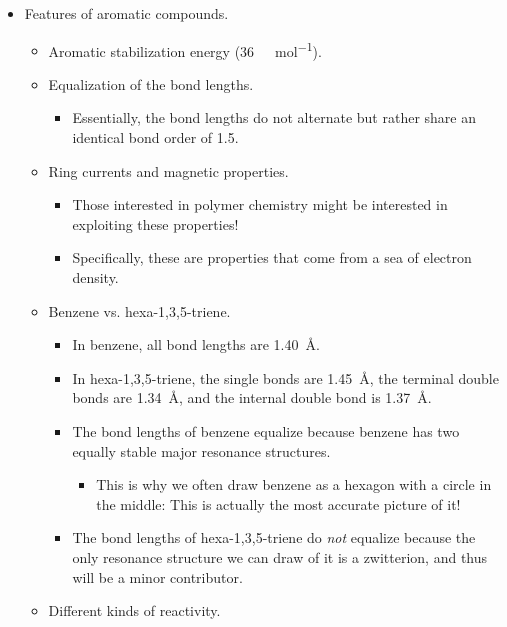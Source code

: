 \documentclass[../notes.tex]{subfiles}
\begin{document}
\begin{itemize}
\begin{itemize}
    \end{itemize}
    \item Features of aromatic compounds.
    \begin{itemize}
        \item Aromatic stabilization energy (\SI[per-mode=symbol]{36}{\kilo\calorie\per\mole}).
        \item Equalization of the bond lengths.
        \begin{itemize}
            \item Essentially, the bond lengths do not alternate but rather share an identical bond order of 1.5.
        \end{itemize}
        \item Ring currents and magnetic properties.
        \begin{itemize}
            \item Those interested in polymer chemistry might be interested in exploiting these properties!
            \item Specifically, these are properties that come from a sea of electron density.
        \end{itemize}
        \item Benzene vs. hexa-1,3,5-triene.
        \begin{itemize}
            \item In benzene, all bond lengths are \SI{1.40}{\angstrom}.
            \item In hexa-1,3,5-triene, the single bonds are \SI{1.45}{\angstrom}, the terminal double bonds are \SI{1.34}{\angstrom}, and the internal double bond is \SI{1.37}{\angstrom}.
            \item The bond lengths of benzene equalize because benzene has two equally stable major resonance structures.
            \begin{itemize}
                \item This is why we often draw benzene as a hexagon with a circle in the middle: This is actually the most accurate picture of it!
            \end{itemize}
            \item The bond lengths of hexa-1,3,5-triene do \emph{not} equalize because the only resonance structure we can draw of it is a zwitterion, and thus will be a minor contributor.
        \end{itemize}
        \item Different kinds of reactivity.
        \begin{itemize}

\end{itemize}
\end{itemize}
\end{itemize}
\end{document}
